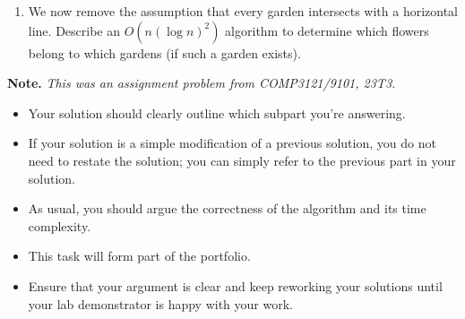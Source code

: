 \documentclass{article}
\begin{document}
\begin{question}
\begin{enumerate}[label = (\alph*)]
    {\bfseries Hint.} {\em What do you know about two adjacent gardens if they have to intersect with a horizontal line?}

    \item We now remove the assumption that every garden intersects with a horizontal line. Describe an $O(n (\log n)^2)$ algorithm to determine which flowers belong to which gardens (if such a garden exists).
\end{enumerate}

{\bfseries Note.} {\em This was an assignment problem from COMP3121/9101, 23T3.}
\end{question}

\begin{rubric}
\begin{itemize}
    \item Your solution should clearly outline which subpart you're answering.

    \item If your solution is a simple modification of a previous solution, you do not need to restate the solution; you can simply refer to the previous part in your solution.

    \item As usual, you should argue the correctness of the algorithm and its time complexity.

    \item This task will form part of the portfolio.
    \item Ensure that your argument is clear and keep reworking your solutions until your lab demonstrator is happy with your work.
\end{itemize}
\end{rubric}
\end{document}
